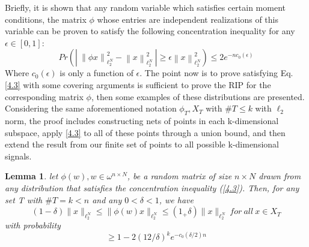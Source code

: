 Briefly, it is shown \citep{concentration_achlioptas} that any random variable which satisfies certain moment conditions, the matrix $\phi$ whose entries are independent realizations of this variable can be proven to satisfy the following concentration inequality for any $\epsilon \in [0,1]$:
\begin{equation}
\label{4.3}
    Pr(|~ \left\| \phi x\right\|_{\ell_2^N}^2- \left\|x \right\|_{\ell_2^N}^2~|\geq \epsilon\left\| x\right\|_{\ell_2^N}^2 )\leq 2e^{-nc_0(\epsilon)}
\end{equation}
Where $c_0(\epsilon)$ is only a function of $\epsilon$. The point now is to prove satisfying Eq.\ref{4.3} with some covering arguments is sufficient to prove the RIP for the corresponding matrix $\phi$, then some examples of these distributions are presented.
Considering the same aforementioned notation $\phi_T, X_T$ with $\#T\leq k$ with $\ell_2$ norm, the proof includes constructing  nets of points in each k-dimensional subspace, apply \ref{4.3} to all of these points through a union bound, and then extend the result from our finite set of points to all possible k-dimensional signals. 
\newtheorem{lemma}{Lemma} 
\begin{lemma}
let $\phi(w), w\in \omega^{n\times N}$, be  a random matrix of size $n\times N$ drawn from any distribution that satisfies the concentration inequality (\ref{4.3}). Then, for any set T with $\#T= k<n$ and any $0< \delta< 1$, we have
\begin{equation}
(1-\delta) \| x\|_{\ell_2^N}  
\leq
\| \phi(w)x\|_{\ell_2^N} 
\leq
(1_+\delta) \| x\|_{\ell_2^N} ~for ~all ~x\in X_T
\label{5.1}
\end{equation}
with probability
\begin{equation}
\geq 1-2(12/\delta)^k e^{-c_0(\delta/2)n}
\label{5.2}
\end{equation}

\end{lemma}

